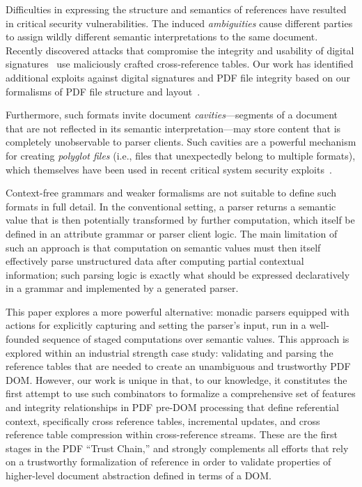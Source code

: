 Difficulties in expressing the structure and semantics of references
have resulted in critical security vulnerabilities.
%
The induced \emph{ambiguities} cause different parties
to assign wildly different semantic interpretations to the same
document.
%
Recently discovered attacks that compromise the integrity and
usability of digital
signatures~\cite{rohlmannBreakingSpecificationPDF2021,
  mainkaShadowAttacksHiding2021} use maliciously crafted
cross-reference tables. Our work has identified additional exploits
against digital signatures and PDF file integrity based on our
formalisms of PDF file structure and layout~\cite{cve25641}.

Furthermore, such formats invite document \emph{cavities}---segments
of a document that are not reflected in its semantic
interpretation---may store content that is completely unobservable to
parser clients.
%
Such cavities are a powerful mechanism for creating \emph{polyglot
  files} (i.e., files that unexpectedly belong to multiple formats),
which themselves have been used in recent critical system security
exploits~\cite{psychicPaper}.

Context-free grammars and weaker formalisms are not suitable to define 
such formats in full detail.
%
In the conventional setting, a parser returns a semantic value that is
then potentially transformed by further computation, which itself be
defined in an attribute grammar or parser client logic.
%
The main limitation of such an approach is that computation on
semantic values must then itself effectively parse unstructured data
after computing partial contextual information;
%
such parsing logic is exactly what should be expressed declaratively
in a grammar and implemented by a generated parser.

This paper explores a more powerful alternative: monadic parsers equipped 
with actions for explicitly capturing and setting the parser's input, run 
in a well-founded sequence of staged computations over semantic values.
%
This approach is explored within an industrial strength case study:
validating and parsing the reference tables that are needed to create 
an unambiguous and trustworthy PDF DOM.
%
However, our work is unique in that, to our knowledge, it constitutes
the first attempt to use such combinators to formalize a comprehensive
set of features and integrity relationships in PDF pre-DOM processing
that define referential context, specifically cross reference tables,
incremental updates, and cross reference table compression within
cross-reference streams.
These are the first stages in the PDF ``Trust Chain,'' and  strongly complements all
efforts that rely on a trustworthy formalization of reference in order
to validate properties of higher-level document abstraction defined in
terms of a DOM.

